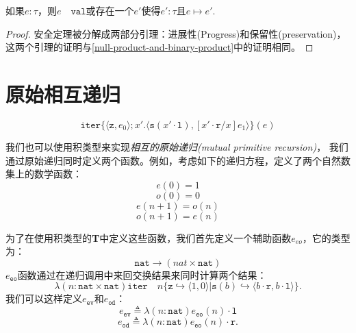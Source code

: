 \begin{theorem}[安全定理]\label{theorem:safety2}
如果$e:\tau$，则$e\quad \mathtt{val}$或存在一个$e'$使得$e':\tau$且$e\longmapsto e'$.
\end{theorem}
\begin{proof}
安全定理被分解成两部分引理：进展性(Progress)和保留性(preservation)，这两个引理的证明与\ref{null-product-and-binary-product}中的证明相同。
\end{proof}

\section{原始相互递归}
$$
\mathtt{iter}\{\langle \mathtt{z},e_0 \rangle ; x'. \langle \mathtt{s}(x'\cdot \mathtt{l}), [x' \cdot \mathtt{r}/x]e_1\rangle \}(e)
$$

我们也可以使用积类型来实现\textit{相互的原始递归(mutual primitive recursion)}，
我们通过原始递归同时定义两个函数。例如，考虑如下的递归方程，定义了两个自然数集上的数学函数：
\begin{equation*}
    e(0) = 1
\end{equation*}
\begin{equation*}
    o(0) = 0
\end{equation*}
\begin{equation*}
    e(n+1) = o(n)
\end{equation*}
\begin{equation*}
    o(n+1) = e(n)
\end{equation*}


为了在使用积类型的\textbf{T}中定义这些函数，我们首先定义一个辅助函数$e_{eo}$，它的类型为：
$$\mathtt{nat} \rightarrow (nat \times \mathtt{nat})$$
$e_{\mathtt{eo}}$函数通过在递归调用中来回交换结果来同时计算两个结果：
$$
\lambda (n:\mathtt{nat}\times \mathtt{nat}) \mathtt{iter} \quad n \{ \mathtt{z} \hookrightarrow \langle 1,0 \rangle |
\mathtt{s}(b) \hookrightarrow \langle b \cdot \mathtt{r}, b \cdot \mathtt{l} \rangle \}.
$$
我们可以这样定义$e_{\mathtt{ev}}$和$e_{\mathtt{od}}$：
\begin{equation*}
    e_{\mathtt{ev}} \triangleq \lambda(n:\mathtt{nat})e_{\mathtt{eo}}(n) \cdot \mathtt{l}
\end{equation*}
\begin{equation*}
    e_{\mathtt{od}} \triangleq \lambda(n:\mathtt{nat})e_{\mathtt{eo}}(n) \cdot \mathtt{r}.
\end{equation*}


